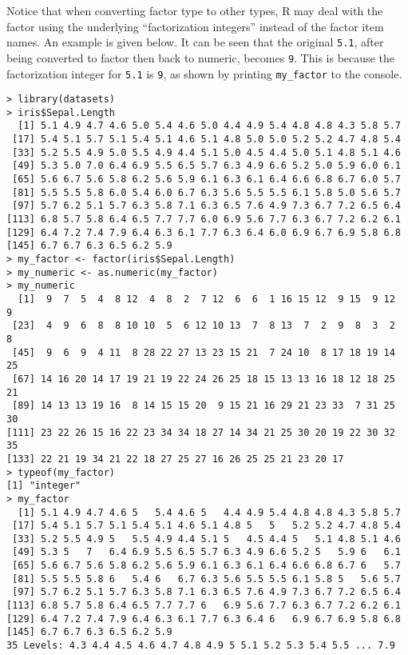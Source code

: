 Notice that when converting factor type to other types, R may deal with the factor using the underlying ``factorization integers'' instead of the factor item names. An example is given below. It can be seen that the original \verb|5.1|, after being converted to factor then back to numeric, becomes \verb|9|. This is because the factorization integer for \verb|5.1| is \verb|9|, as shown by printing \verb|my_factor| to the console.
\begin{lstlisting}
> library(datasets)
> iris$Sepal.Length
  [1] 5.1 4.9 4.7 4.6 5.0 5.4 4.6 5.0 4.4 4.9 5.4 4.8 4.8 4.3 5.8 5.7
 [17] 5.4 5.1 5.7 5.1 5.4 5.1 4.6 5.1 4.8 5.0 5.0 5.2 5.2 4.7 4.8 5.4
 [33] 5.2 5.5 4.9 5.0 5.5 4.9 4.4 5.1 5.0 4.5 4.4 5.0 5.1 4.8 5.1 4.6
 [49] 5.3 5.0 7.0 6.4 6.9 5.5 6.5 5.7 6.3 4.9 6.6 5.2 5.0 5.9 6.0 6.1
 [65] 5.6 6.7 5.6 5.8 6.2 5.6 5.9 6.1 6.3 6.1 6.4 6.6 6.8 6.7 6.0 5.7
 [81] 5.5 5.5 5.8 6.0 5.4 6.0 6.7 6.3 5.6 5.5 5.5 6.1 5.8 5.0 5.6 5.7
 [97] 5.7 6.2 5.1 5.7 6.3 5.8 7.1 6.3 6.5 7.6 4.9 7.3 6.7 7.2 6.5 6.4
[113] 6.8 5.7 5.8 6.4 6.5 7.7 7.7 6.0 6.9 5.6 7.7 6.3 6.7 7.2 6.2 6.1
[129] 6.4 7.2 7.4 7.9 6.4 6.3 6.1 7.7 6.3 6.4 6.0 6.9 6.7 6.9 5.8 6.8
[145] 6.7 6.7 6.3 6.5 6.2 5.9
> my_factor <- factor(iris$Sepal.Length)
> my_numeric <- as.numeric(my_factor)
> my_numeric
  [1]  9  7  5  4  8 12  4  8  2  7 12  6  6  1 16 15 12  9 15  9 12  9
 [23]  4  9  6  8  8 10 10  5  6 12 10 13  7  8 13  7  2  9  8  3  2  8
 [45]  9  6  9  4 11  8 28 22 27 13 23 15 21  7 24 10  8 17 18 19 14 25
 [67] 14 16 20 14 17 19 21 19 22 24 26 25 18 15 13 13 16 18 12 18 25 21
 [89] 14 13 13 19 16  8 14 15 15 20  9 15 21 16 29 21 23 33  7 31 25 30
[111] 23 22 26 15 16 22 23 34 34 18 27 14 34 21 25 30 20 19 22 30 32 35
[133] 22 21 19 34 21 22 18 27 25 27 16 26 25 25 21 23 20 17
> typeof(my_factor)
[1] "integer"
> my_factor
  [1] 5.1 4.9 4.7 4.6 5   5.4 4.6 5   4.4 4.9 5.4 4.8 4.8 4.3 5.8 5.7
 [17] 5.4 5.1 5.7 5.1 5.4 5.1 4.6 5.1 4.8 5   5   5.2 5.2 4.7 4.8 5.4
 [33] 5.2 5.5 4.9 5   5.5 4.9 4.4 5.1 5   4.5 4.4 5   5.1 4.8 5.1 4.6
 [49] 5.3 5   7   6.4 6.9 5.5 6.5 5.7 6.3 4.9 6.6 5.2 5   5.9 6   6.1
 [65] 5.6 6.7 5.6 5.8 6.2 5.6 5.9 6.1 6.3 6.1 6.4 6.6 6.8 6.7 6   5.7
 [81] 5.5 5.5 5.8 6   5.4 6   6.7 6.3 5.6 5.5 5.5 6.1 5.8 5   5.6 5.7
 [97] 5.7 6.2 5.1 5.7 6.3 5.8 7.1 6.3 6.5 7.6 4.9 7.3 6.7 7.2 6.5 6.4
[113] 6.8 5.7 5.8 6.4 6.5 7.7 7.7 6   6.9 5.6 7.7 6.3 6.7 7.2 6.2 6.1
[129] 6.4 7.2 7.4 7.9 6.4 6.3 6.1 7.7 6.3 6.4 6   6.9 6.7 6.9 5.8 6.8
[145] 6.7 6.7 6.3 6.5 6.2 5.9
35 Levels: 4.3 4.4 4.5 4.6 4.7 4.8 4.9 5 5.1 5.2 5.3 5.4 5.5 ... 7.9
\end{lstlisting}

